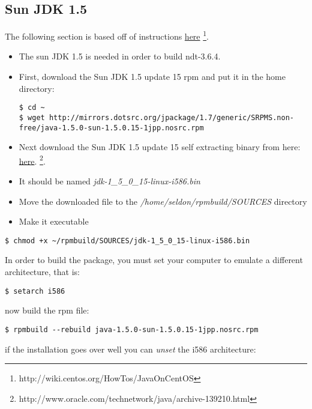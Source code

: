 \subsection{Sun JDK 1.5}
The following section is based off of instructions \href{http://wiki.centos.org/HowTos/JavaOnCentOS}{here} \footnote{http://wiki.centos.org/HowTos/JavaOnCentOS}.
\begin{itemize}
\item{The sun JDK 1.5 is needed in order to build ndt-3.6.4.}
\item{First, download the Sun JDK 1.5 update 15 rpm and put it in the home directory:}
\begin{snugshade}\begin{lstlisting}
$ cd ~
$ wget http://mirrors.dotsrc.org/jpackage/1.7/generic/SRPMS.non-free/java-1.5.0-sun-1.5.0.15-1jpp.nosrc.rpm
\end{lstlisting}\end{snugshade}\noindent
\item{Next download the Sun JDK 1.5 update 15 self extracting binary from here: \href{http://www.oracle.com/technetwork/java/archive-139210.html}{here}. \footnote{http://www.oracle.com/technetwork/java/archive-139210.html}.}
\item{It should be named \textit{jdk-1\_5\_0\_15-linux-i586.bin}}
\item{Move the downloaded file to the \textit{/home/seldon/rpmbuild/SOURCES} directory}
\item{Make it executable}
\end{itemize}
\begin{snugshade}\begin{lstlisting}
$ chmod +x ~/rpmbuild/SOURCES/jdk-1_5_0_15-linux-i586.bin
\end{lstlisting}\end{snugshade}\noindent
In order to build the package, you must set your computer to emulate a different architecture, that is: 
\begin{snugshade}\begin{lstlisting}
$ setarch i586
\end{lstlisting}\end{snugshade}\noindent
now build the rpm file:
\begin{snugshade}\begin{lstlisting}
$ rpmbuild --rebuild java-1.5.0-sun-1.5.0.15-1jpp.nosrc.rpm
\end{lstlisting}\end{snugshade}\noindent
if the installation goes over well you can \textit{unset} the i586 architecture:

